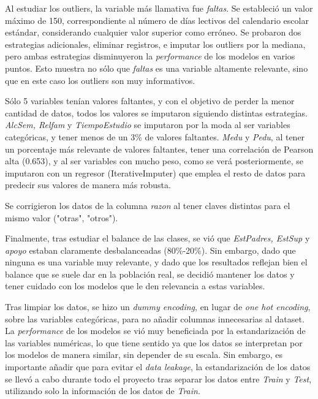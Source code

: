 \documentclass{article}
\begin{document}
Al estudiar los outliers, la variable más llamativa fue \textit{faltas}. Se estableció un valor máximo de 150, correspondiente al número de días lectivos del calendario escolar estándar, considerando 
cualquier valor superior como erróneo. Se probaron dos estrategias adicionales, eliminar registros, e imputar los outliers por la mediana, pero ambas estrategias disminuyeron la 
\textit{performance} de los modelos en varios puntos. Esto muestra no sólo que \textit{faltas} es una variable altamente relevante, sino que en este caso los outliers son muy informativos.


Sólo 5 variables tenían valores faltantes, y con el objetivo de perder la menor cantidad de datos, todos los valores se imputaron siguiendo distintas estrategias.
\textit{AlcSem, Relfam} y \textit{TiempoEstudio} se imputaron por la moda al ser variables categóricas, y tener menos de un 3\% de valores faltantes. \textit{Medu} y \textit{Pedu}, 
al tener un porcentaje más relevante de valores faltantes, tener una correlación de Pearson alta (0.653), y al ser variables con mucho peso, como se verá posteriormente, se imputaron con un regresor (IterativeImputer) que emplea el resto de datos
para predecir sus valores de manera más robusta. 

Se corrigieron los datos de la columna \textit{razon} al tener claves distintas para el mismo valor ("otras", "otros").

Finalmente, tras estudiar el balance de las clases, se vió que \textit{EstPadres, EstSup} y \textit{apoyo} estaban claramente desbalanceadas (80\%-20\%). Sin embargo, dado que ninguna es una variable
muy relevante, y dado que los resultados reflejan bien el balance que se suele dar en la población real, se decidió mantener los datos y tener cuidado con los modelos que le den relevancia a estas variables.

Tras limpiar los datos, se hizo un \textit{dummy encoding}, en lugar de \textit{one hot encoding}, sobre las variables categóricas, para no añadir columnas innecesarias al dataset. La \textit{performance} de los modelos se vió muy beneficiada por la estandarización de las variables numéricas, lo que tiene sentido ya que los datos se interpretan por los modelos de manera similar, sin depender de su escala.
Sin embargo, es importante añadir que para evitar el \textit{data leakage}, la estandarización de los datos se llevó a cabo durante todo el proyecto tras separar los datos entre \textit{Train} y \textit{Test}, utilizando solo la información de los datos de \textit{Train}. 
\end{document}
